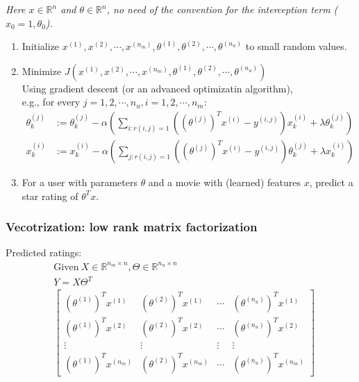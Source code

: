 \emph{\textcolor{Bittersweet}{Here $x \in \mathbb{R}^n$ and $\theta \in \mathbb{R}^n$, no need of the convention for the interception term ($x_0 = 1, \theta_0$).}}
\begin{enumerate}
    \item
        Initialize $x^{(1)}, x^{(2)}, \cdots, x^{(n_m)}, \theta^{(1)}, \theta^{(2)}, \cdots, \theta^{(n_u)}$ to small random values.
    \item
        Minimize $J(x^{(1)}, x^{(2)}, \cdots, x^{(n_m)}, \theta^{(1)}, \theta^{(2)}, \cdots, \theta^{(n_u)})$\\
        Using gradient descent (or an advanced optimizatin algorithm),\\
        e.g., for every $j = 1, 2, \cdots, n_{u}, i = 1, 2, \cdots, n_m$:
        \begin{align*}
        \theta_k^{(j)} &:= \theta_k^{(j)} - \alpha \left( \sum_{i : r(i,j)=1}\left((\theta^{(j)})^Tx^{(i)} - y^{(i,j)}\right)x_k^{(i)} + \lambda\theta_k^{(j)} \right)\\
        x_k^{(i)} &:= x_k^{(i)} - \alpha \left( \sum_{j : r(i,j)=1}\left((\theta^{(j)})^Tx^{(i)} - y^{(i,j)}\right)\theta_k^{(j)} + \lambda x_k^{(i)}\right)
        \end{align*}
    \item
        For a user with parameters $\theta$ and a movie with (learned) features $x$, predict a star rating of $\theta^Tx$.
\end{enumerate}

\subsubsection{Vecotrization: low rank matrix factorization}
Predicted ratings:
\begin{align*}
&\text{Given} ~ X \in \mathbb{R}^{n_m \times n}, \Theta \in \mathbb{R}^{n_u \times n}\\
&Y = X\Theta^T\\
&\begin{bmatrix}
(\theta^{(1)})^Tx^{(1)} & (\theta^{(2)})^Tx^{(1)} & \cdots & (\theta^{(n_u)})^Tx^{(1)} \\
(\theta^{(1)})^Tx^{(2)} & (\theta^{(2)})^Tx^{(2)} & \cdots & (\theta^{(n_u)})^Tx^{(2)} \\
\vdots			 & \vdots			      & \vdots & \vdots				     \\
(\theta^{(1)})^Tx^{(n_m)} & (\theta^{(2)})^Tx^{(n_m)} & \cdots & (\theta^{(n_u)})^Tx^{(n_m)}
\end{bmatrix}
\end{align*}

